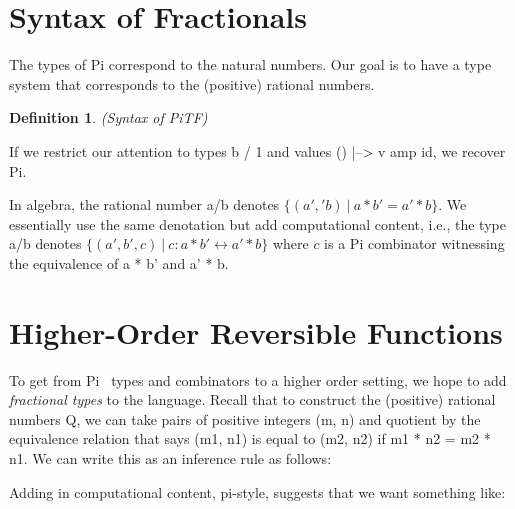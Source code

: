 \documentclass{sigplanconf}
\newtheorem{definition}[theorem]{Definition}
\begin{document}
\section{Syntax of Fractionals}

The types of {{Pi}} correspond to the natural numbers. Our goal is to have a
type system that corresponds to the (positive) rational numbers. 

\begin{definition}{(Syntax of {{PiTF}})}
\label{def:PiTF}
%
\end{definition}

If we restrict our attention to types {{b / 1}} and values {{ () |--> v amp id}},
we recover {{Pi}}. 

In algebra, the rational number {{a/b}} denotes 
$\{ (a','b) ~|~ a * b' = a' * b \}$. We essentially use the same denotation but
add computational content, i.e., the type {{a/b}} denotes
$\{ (a',b',c) ~|~ c : a * b' \leftrightarrow a' * b \}$ where $c$ is a {{Pi}}
combinator witnessing the equivalence of {{a * b'}} and {{a' * b}}. 

\section{Higher-Order Reversible Functions}

To get from {{Pi}}~\cite{James:2012:IE:2103656.2103667} types and combinators
to a higher order setting, we hope to add \emph{fractional types} to the
language. Recall that to construct the (positive) rational numbers {{Q}}, we
can take pairs of positive integers {{(m, n)}} and quotient by the
equivalence relation that says {{(m1, n1)}} is equal to {{(m2, n2)}} if 
{{m1 * n2 = m2 * n1}}. We can write this as an inference rule as follows:


\noindent
Adding in computational content, pi-style, suggests that we want something like:
\end{document}
